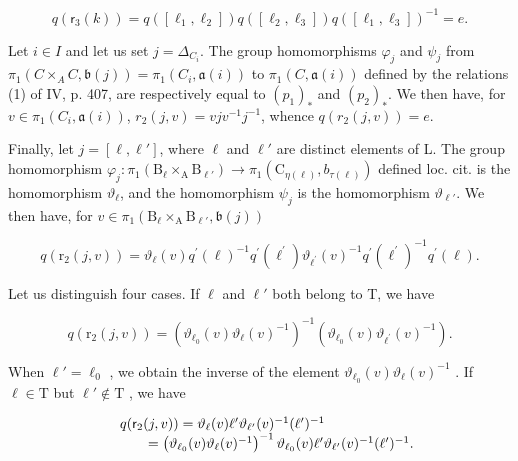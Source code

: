 \[
q (\mathsf {r} _ {3} (k)) = q ([ \ell_ {1}, \ell_ {2} ]) q ([ \ell_ {2}, \ell_ {3} ]) q ([ \ell_ {1}, \ell_ {3} ]) ^ {- 1} = e.
\]

Let \(i \in I\) and let us set \(j = \Delta_{C_i}\). The group homomorphisms \(\varphi_j\) and \(\psi_j\) from \(\pi_1(C \times_A C, \mathfrak{b}(j)) = \pi_1(C_i, \mathfrak{a}(i))\) to \(\pi_1(C, \mathfrak{a}(i))\) defined by the relations (1) of IV, p. 407, are respectively equal to \((p_1)_*\) and \((p_2)_*\). We then have, for \(v \in \pi_1(C_i, \mathfrak{a}(i))\), \(r_2(j, v) = v j v^{-1} j^{-1}\), whence \(q(r_2(j, v)) = e\).

Finally, let \(j = [\ell, \ell']\), where \(\ell\) and \(\ell'\) are distinct elements of L. The group homomorphism \(\varphi_j \colon \pi_1(\mathrm{B}_{\ell} \times_{\mathrm{A}} \mathrm{B}_{\ell'}) \to \pi_1(\mathrm{C}_{\eta(\ell)}, b_{\tau(\ell)})\) defined loc. cit. is the homomorphism \(\vartheta_\ell\), and the homomorphism \(\psi_j\) is the homomorphism \(\vartheta_{\ell'}\). We then have, for \(v \in \pi_1(\mathrm{B}_\ell \times_{\mathrm{A}} \mathrm{B}_{\ell'}, \mathfrak{b}(j))\)

\[
q \left(\mathrm{r} _ {2} (j, v)\right) = \vartheta_ {\ell} (v) q ^ {\prime} (\ell) ^ {- 1} q ^ {\prime} \left(\ell^ {\prime}\right) \vartheta_ {\ell^ {\prime}} (v) ^ {- 1} q ^ {\prime} \left(\ell^ {\prime}\right) ^ {- 1} q ^ {\prime} (\ell).
\]

Let us distinguish four cases. If \(\ell\) and \(\ell'\) both belong to T, we have

\[
q \left(\mathrm{r} _ {2} (j, v)\right) = \left. \left(\vartheta_ {\ell_ {0}} (v) \vartheta_ {\ell} (v) ^ {- 1}\right) ^ {- 1} \left(\vartheta_ {\ell_ {0}} (v) \vartheta_ {\ell^ {\prime}} (v) ^ {- 1}\right). \right.
\]

When \(\ell' = \ell_0\) , we obtain the inverse of the element \(\vartheta_{\ell_0}(v)\vartheta_\ell(v)^{-1}\) . If \(\ell \in \mathrm{T}\) but \(\ell' \notin \mathrm{T}\) , we have

\[
\begin{array}{r l} & q (\mathsf {r} _ {2} (j, v)) = \vartheta_ {\ell} (v) \ell^ {\prime} \vartheta_ {\ell^ {\prime}} (v) ^ {- 1} (\ell^ {\prime}) ^ {- 1} \\ & \qquad = \left(\vartheta_ {\ell_ {0}} (v) \vartheta_ {\ell} (v) ^ {- 1}\right) ^ {- 1} \vartheta_ {\ell_ {0}} (v) \ell^ {\prime} \vartheta_ {\ell^ {\prime}} (v) ^ {- 1} (\ell^ {\prime}) ^ {- 1}. \end{array}
\]

